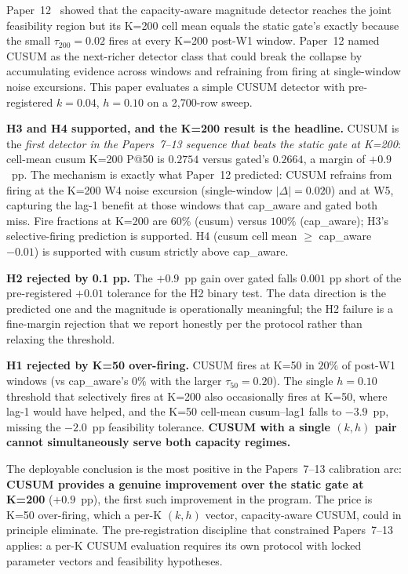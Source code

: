 Paper~12~\cite{paper12capaware} showed that the capacity-aware
magnitude detector reaches the joint feasibility region but its
K=200 cell mean equals the static gate's exactly because the small
$\tau_{200} = 0.02$ fires at every K=200 post-W1 window. Paper~12
named CUSUM as the next-richer detector class that could break the
collapse by accumulating evidence across windows and refraining from
firing at single-window noise excursions. This paper evaluates a
simple CUSUM detector with pre-registered $k = 0.04$, $h = 0.10$
on a 2{,}700-row sweep.

\textbf{H3 and H4 supported, and the K=200 result is the headline.}
CUSUM is the \textit{first detector in the Papers~7--13 sequence that
beats the static gate at K=200}: cell-mean cusum K=200 P@50 is
$0.2754$ versus gated's $0.2664$, a margin of $+0.9$~pp. The
mechanism is exactly what Paper~12 predicted: CUSUM refrains from
firing at the K=200 W4 noise excursion (single-window $|\Delta| =
0.020$) and at W5, capturing the lag-1 benefit at those windows
that cap\_aware and gated both miss. Fire fractions at K=200 are
$60\%$ (cusum) versus $100\%$ (cap\_aware); H3's selective-firing
prediction is supported. H4 (cusum cell mean $\geq$ cap\_aware $-
0.01$) is supported with cusum strictly above cap\_aware.

\textbf{H2 rejected by 0.1 pp.} The $+0.9$~pp gain over gated falls
$0.001$ pp short of the pre-registered $+0.01$ tolerance for the
H2 binary test. The data direction is the predicted one and the
magnitude is operationally meaningful; the H2 failure is a
fine-margin rejection that we report honestly per the protocol
rather than relaxing the threshold.

\textbf{H1 rejected by K=50 over-firing.} CUSUM fires at K=50 in
$20\%$ of post-W1 windows (vs cap\_aware's $0\%$ with the larger
$\tau_{50} = 0.20$). The single $h = 0.10$ threshold that selectively
fires at K=200 also occasionally fires at K=50, where lag-1 would
have helped, and the K=50 cell-mean cusum--lag1 falls to $-3.9$~pp,
missing the $-2.0$~pp feasibility tolerance. \textbf{CUSUM with a
single $(k, h)$ pair cannot simultaneously serve both capacity
regimes.}

The deployable conclusion is the most positive in the Papers~7--13
calibration arc: \textbf{CUSUM provides a genuine improvement over
the static gate at K=200} ($+0.9$~pp), the first such improvement
in the program. The price is K=50 over-firing, which a per-K $(k, h)$
vector, capacity-aware CUSUM, could in principle eliminate.
The pre-registration discipline that constrained Papers~7--13
applies: a per-K CUSUM evaluation requires its own protocol with
locked parameter vectors and feasibility hypotheses.
